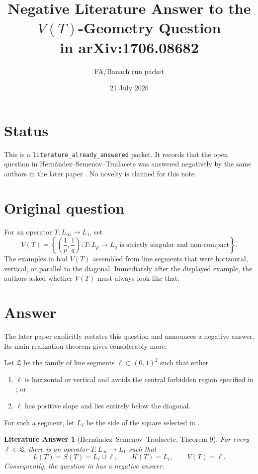 \documentclass[11pt]{article}
\title{Negative Literature Answer to the $V(T)$-Geometry Question\\
in arXiv:1706.08682}
\author{FA/Banach run packet}
\date{21 July 2026}
\newtheorem*{theorem}{Literature Answer}
\begin{document}
\maketitle

\section*{Status}

This is a \texttt{literature\_already\_answered} packet.  It records that the
open question in Hernández--Semenov--Tradacete \cite{HST17} was answered
negatively by the same authors in the later paper \cite{HST20}.  No novelty is
claimed for this note.

\section*{Original question}

For an operator $T:L_\infty\to L_1$, set
\[
 V(T)=\left\{\left(\frac1p,\frac1q\right):
 T:L_p\to L_q\text{ is strictly singular and non-compact}\right\}.
\]
The examples in \cite{HST17} had $V(T)$ assembled from line segments that
were horizontal, vertical, or parallel to the diagonal.  Immediately after
the displayed example, the authors asked whether $V(T)$ must always look
like that.

\section*{Answer}

The later paper \cite{HST20} explicitly restates this question and announces
a negative answer.  Its main realization theorem gives considerably more.

Let $\mathfrak L$ be the family of line segments $\ell\subset(0,1)^2$
such that either
\begin{enumerate}
\item $\ell$ is horizontal or vertical and avoids the central forbidden
region specified in \cite{HST20}; or
\item $\ell$ has positive slope and lies entirely below the diagonal.
\end{enumerate}
For such a segment, let $L_\ell$ be the side of the square selected in
\cite{HST20}.

\begin{theorem}[Hernández--Semenov--Tradacete, Theorem 9]
For every $\ell\in\mathfrak L$, there is an operator
$T:L_\infty\to L_1$ such that
\[
 L(T)=S(T)=L_\ell\cup\ell,\qquad
 K(T)=L_\ell,\qquad
 V(T)=\ell.
\]
Consequently, the question in \cite{HST17} has a negative answer.
\end{theorem}
\end{document}
